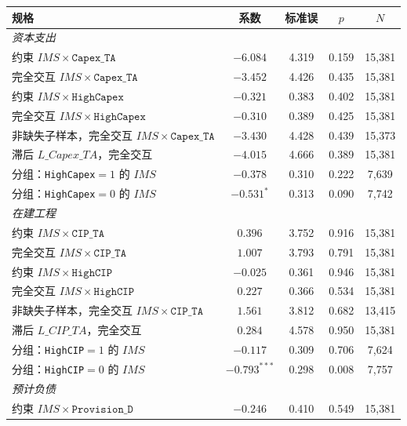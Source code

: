 \documentclass[11pt]{article}
\begin{document}
\begin{center}
\begin{threeparttable}
\caption{财务交叉：\(IMS\) 交互与分组}
\label{tab:financial}
\begin{tabular}{lcccc}
\toprule
规格 & 系数 & 标准误 & \(p\) & \(N\) \\
\midrule
\multicolumn{5}{l}{\textit{资本支出}} \\
约束 \(IMS\times\texttt{Capex\_TA}\) & \(-6.084\) & 4.319 & 0.159 & 15,381 \\
完全交互 \(IMS\times\texttt{Capex\_TA}\) & \(-3.452\) & 4.426 & 0.435 & 15,381 \\
约束 \(IMS\times\texttt{HighCapex}\) & \(-0.321\) & 0.383 & 0.402 & 15,381 \\
完全交互 \(IMS\times\texttt{HighCapex}\) & \(-0.310\) & 0.389 & 0.425 & 15,381 \\
非缺失子样本，完全交互 \(IMS\times\texttt{Capex\_TA}\) & \(-3.430\) & 4.428 & 0.439 & 15,373 \\
滞后 \(L\_Capex\_TA\)，完全交互 & \(-4.015\) & 4.666 & 0.389 & 15,381 \\
分组：\texttt{HighCapex}\(=1\) 的 \(IMS\) & \(-0.378\) & 0.310 & 0.222 & 7,639 \\
分组：\texttt{HighCapex}\(=0\) 的 \(IMS\) & \(-0.531^{*}\) & 0.313 & 0.090 & 7,742 \\
\midrule
\multicolumn{5}{l}{\textit{在建工程}} \\
约束 \(IMS\times\texttt{CIP\_TA}\) & \(0.396\) & 3.752 & 0.916 & 15,381 \\
完全交互 \(IMS\times\texttt{CIP\_TA}\) & \(1.007\) & 3.793 & 0.791 & 15,381 \\
约束 \(IMS\times\texttt{HighCIP}\) & \(-0.025\) & 0.361 & 0.946 & 15,381 \\
完全交互 \(IMS\times\texttt{HighCIP}\) & \(0.227\) & 0.366 & 0.534 & 15,381 \\
非缺失子样本，完全交互 \(IMS\times\texttt{CIP\_TA}\) & \(1.561\) & 3.812 & 0.682 & 13,415 \\
滞后 \(L\_CIP\_TA\)，完全交互 & \(0.284\) & 4.578 & 0.950 & 15,381 \\
分组：\texttt{HighCIP}\(=1\) 的 \(IMS\) & \(-0.117\) & 0.309 & 0.706 & 7,624 \\
分组：\texttt{HighCIP}\(=0\) 的 \(IMS\) & \(-0.793^{***}\) & 0.298 & 0.008 & 7,757 \\
\midrule
\multicolumn{5}{l}{\textit{预计负债}} \\
约束 \(IMS\times\texttt{Provision\_D}\) & \(-0.246\) & 0.410 & 0.549 & 15,381 \\

\end{tabular}
\end{threeparttable}
\end{center}
\end{document}
